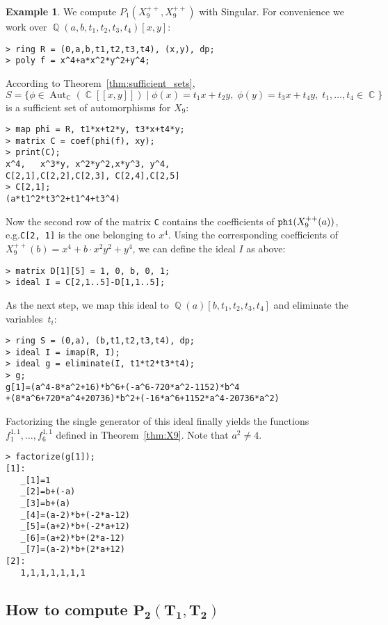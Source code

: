 \documentclass[noend]{amsproc}
\theoremstyle{definition}
\newtheorem{example}[theorem]{Example}
\DeclareMathOperator{\Q}{\mathbb{Q}}
\DeclareMathOperator{\C}{\mathbb{C}}
\DeclareMathOperator{\Aut}{Aut}
\begin{document}
\begin{example}\label{ex:P1}
We compute $P_1(X_9^{++}, X_9^{++})$ with Singular. For convenience we work
over $\Q(a,b,t_1,t_2,t_3,t_4)[x,y]$:
\begin{verbatim}
> ring R = (0,a,b,t1,t2,t3,t4), (x,y), dp;
> poly f = x^4+a*x^2*y^2+y^4;
\end{verbatim}
According to Theorem~\ref{thm:sufficient_sets},
\[
S = \{ \phi \in \Aut_{\C}(\C[[x,y]])
\mid \phi(x) = t_1 x + t_2 y,\; \phi(y) = t_3 x + t_4 y,\;
t_1, \ldots, t_4 \in \C \}
\]
is a sufficient set of automorphisms for $X_9$:
\begin{verbatim}
> map phi = R, t1*x+t2*y, t3*x+t4*y;
> matrix C = coef(phi(f), xy);
> print(C);
x^4,   x^3*y, x^2*y^2,x*y^3, y^4,  
C[2,1],C[2,2],C[2,3], C[2,4],C[2,5]
> C[2,1];
(a*t1^2*t3^2+t1^4+t3^4)
\end{verbatim}
Now the second row of the matrix \verb+C+ contains the coefficients of
$\verb+phi+(X_9^{++}(a))$, e.g.\@ \verb+C[2, 1]+ is the one belonging to $x^4$.
Using the corresponding coefficients of
$X_9^{++}(b) = x^4 + b \cdot x^2 y^2 + y^4$, we can define the ideal $I$ as
above:
\begin{verbatim}
> matrix D[1][5] = 1, 0, b, 0, 1;
> ideal I = C[2,1..5]-D[1,1..5];
\end{verbatim}
As the next step, we map this ideal to $\Q(a)[b,t_1,t_2,t_3,t_4]$ and eliminate
the variables~$t_i$:
\begin{verbatim}
> ring S = (0,a), (b,t1,t2,t3,t4), dp;
> ideal I = imap(R, I);
> ideal g = eliminate(I, t1*t2*t3*t4);
> g;
g[1]=(a^4-8*a^2+16)*b^6+(-a^6-720*a^2-1152)*b^4
+(8*a^6+720*a^4+20736)*b^2+(-16*a^6+1152*a^4-20736*a^2)
\end{verbatim}
Factorizing the single generator of this ideal finally yields the functions
$f_1^{1,1}, \ldots, f_6^{1,1}$ defined in Theorem~\ref{thm:X9}. Note that
$a^2 \neq 4$.
\begin{verbatim}
> factorize(g[1]);
[1]:
   _[1]=1
   _[2]=b+(-a)
   _[3]=b+(a)
   _[4]=(a-2)*b+(-2*a-12)
   _[5]=(a+2)*b+(-2*a+12)
   _[6]=(a+2)*b+(2*a-12)
   _[7]=(a-2)*b+(2*a+12)
[2]:
   1,1,1,1,1,1,1
\end{verbatim}
\end{example}


\subsection{How to compute $\boldsymbol{P_2(T_1, T_2)}$}%
\label{ssec:computing_P2}
\end{document}
